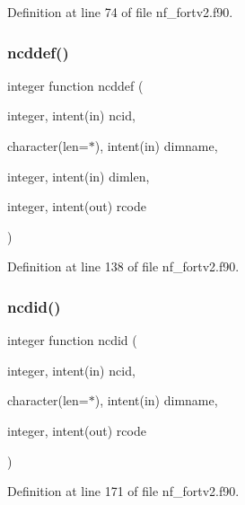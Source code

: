 Definition at line 74 of file nf\+\_\+fortv2.\+f90.

\mbox{\label{nf__fortv2_8f90_a78171f3b2ee4a6763e764c357d57836e}} 
\subsubsection{\texorpdfstring{ncddef()}{ncddef()}}
{\footnotesize\ttfamily integer function ncddef (\begin{DoxyParamCaption}\item[{integer, intent(in)}]{ncid,  }\item[{character(len=$\ast$), intent(in)}]{dimname,  }\item[{integer, intent(in)}]{dimlen,  }\item[{integer, intent(out)}]{rcode }\end{DoxyParamCaption})}



Definition at line 138 of file nf\+\_\+fortv2.\+f90.

\mbox{\label{nf__fortv2_8f90_ac39b06f8d9b6ca78ff6073608ac25115}} 
\subsubsection{\texorpdfstring{ncdid()}{ncdid()}}
{\footnotesize\ttfamily integer function ncdid (\begin{DoxyParamCaption}\item[{integer, intent(in)}]{ncid,  }\item[{character(len=$\ast$), intent(in)}]{dimname,  }\item[{integer, intent(out)}]{rcode }\end{DoxyParamCaption})}



Definition at line 171 of file nf\+\_\+fortv2.\+f90.

\mbox{\label{nf__fortv2_8f90_a6ee036c798e7436b1d962c7dfc8a6957}} 
